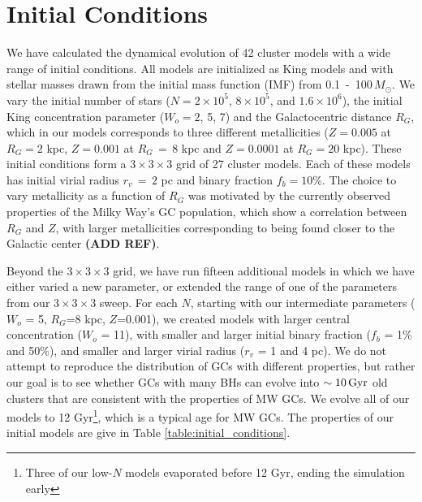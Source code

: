 \documentclass[12pt,preprint]{aastex}
\begin{document}



\section{Initial Conditions}

We have calculated the dynamical evolution of 42 cluster models with a wide range of
initial conditions. All models are initialized as King models and with stellar masses 
drawn from the \cite{Kroupa2001} initial mass function (IMF) from 
0.1 \,-\, 100$\, M_\odot$. We vary the initial number of stars 
($N=2 \times 10^5$, $8 \times 10^5$, and $1.6 \times 10^6$), the initial King 
concentration parameter ($W_o=2$, 5, 7) and the Galactocentric distance $R_G$, 
which in our models corresponds to three different metallicities
($Z=0.005$ at $R_G=2$ kpc, $Z = 0.001$ at $R_G\,=\,8$ kpc and $Z=0.0001$ at $R_G=20$ kpc). 
These initial conditions form a $3 \times 3 \times 3$ grid of 27 cluster models. 
Each of these models has initial virial radius $r_v\,=\,2$ pc and binary fraction
 $f_b = 10$\%. The choice to vary metallicity as a function of $R_G$ was 
 motivated by the currently observed properties of the Milky Way's GC population, 
 which show a correlation between $R_G$ and $Z$, with larger metallicities 
 corresponding to being found closer to the Galactic center \textbf{(ADD REF)}.

Beyond the $3 \times 3 \times 3$ grid, we have run fifteen additional models
in which we have either varied a new parameter, or extended the range of one of the 
parameters from our $3\times3\times3$ sweep. For each $N$, starting with our 
intermediate parameters ($W_o$ = 5, $R_G$=8 kpc, $Z$=0.001),
we created models with larger central concentration ($W_o$ = 11), with smaller and
larger initial binary fraction ($f_b$ = 1\% and 50\%), and smaller and larger virial radius 
($r_v$ = 1 and 4 pc). We do not attempt to reproduce the distribution of GCs with 
different properties, but rather our goal is to see whether GCs with many BHs can 
evolve into $\sim 10\, \rm Gyr$ old clusters that are consistent with the properties of MW GCs. 
We evolve all of our models to 12 Gyr\footnote{Three of our low-$N$ models evaporated
before 12 Gyr, ending the simulation early}, which is a typical age for MW GCs. 
The properties of our initial models are give in Table \ref{table:initial_conditions}.
\end{document}
